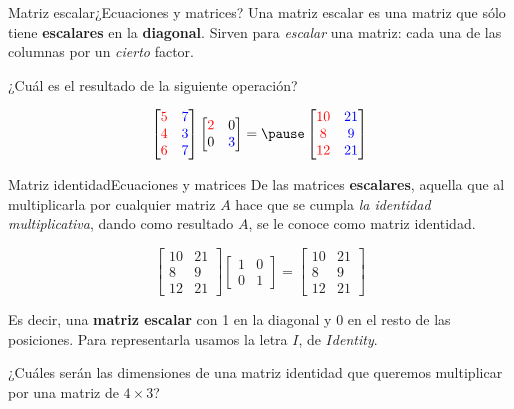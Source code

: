 \documentclass[spanish, c]{beamer}
\begin{document}
\begin{frame}{Matriz escalar}{¿Ecuaciones y matrices?}
    Una \alert{matriz escalar} es una matriz que sólo tiene \textbf{escalares} en la \textbf{diagonal}. Sirven para \textit{escalar} una matriz: cada una de las columnas por un \textit{cierto} factor. \pause

    \bigskip

    ¿Cuál es el resultado de la siguiente operación? \bigskip

    \[
        \begin{bmatrix}
            \color{red} 5 & \color{blue} 7 \\
            \color{red} 4 & \color{blue} 3 \\
            \color{red} 6 & \color{blue} 7
        \end{bmatrix}
        \begin{bmatrix*}
            \color{red} 2 & 0 \\
            0 & \color{blue} 3
        \end{bmatrix*} = \pause
        \begin{bmatrix*}
            \color{red} 10 & \color{blue} 21 \\
            \color{red} 8 & \color{blue} 9 \\
            \color{red} 12 & \color{blue} 21
        \end{bmatrix*}
    \]
\end{frame}

\begin{frame}{Matriz identidad}{Ecuaciones y matrices}
    De las matrices \textbf{escalares}, aquella que al multiplicarla por cualquier matriz $A$ hace que se cumpla \textit{la identidad multiplicativa}, dando como resultado $A$, se le conoce como \alert{matriz identidad}. \pause

    \bigskip

    \[
        \begin{bmatrix*}
            10 & 21 \\
            8 & 9 \\
            12 & 21
        \end{bmatrix*}
        \begin{bmatrix*}
            1 & 0  \\
            0 & 1
        \end{bmatrix*} = \begin{bmatrix*}
            10 & 21 \\
            8 & 9 \\
            12 & 21
        \end{bmatrix*}
    \] \pause

    \bigskip

    Es decir, una \textbf{matriz escalar} con 1 en la diagonal y 0 en el resto de las posiciones. Para representarla usamos la letra $I$, de $I$\textit{dentity}. \pause

    \bigskip

    ¿Cuáles serán las dimensiones de una \alert{matriz identidad} que queremos multiplicar por una matriz de $4 \times 3$?
\end{frame}
\end{document}
